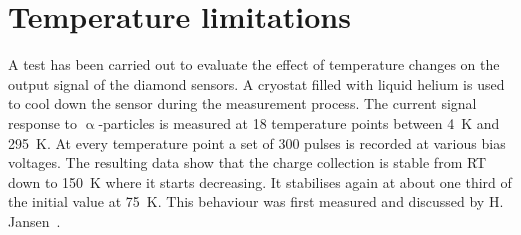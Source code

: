 








\clearpage
\section{Temperature limitations}
\label{sec:templimit}
A test has been carried out to evaluate the effect of temperature changes on the output signal of the diamond sensors. A cryostat filled with liquid helium is used to cool down the sensor during the measurement process. The current signal response to $\upalpha$-particles is measured at 18 temperature points between 4~K and 295~K. At every temperature point a set of 300 pulses is recorded at various bias voltages. The resulting data show that the charge collection is stable from RT down to 150~K where it starts decreasing. It stabilises again at about one third of the initial value at 75~K. This behaviour was first measured and discussed by H. Jansen~\cite{Jansen:1956431}.






%


